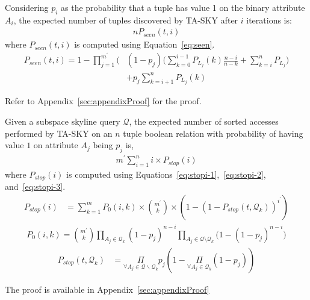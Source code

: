 \vspace{1mm}

\begin{lemma}\label{lemma:expectedDiscovery}
Considering $p_i$ as the probability that a tuple has value 1 on the binary attribute $A_i$, the expected number of tuples discovered by TA-SKY after $i$ iterations is:
\begin{align}\label{eq:expectedDiscovery}
n P_{seen}(t,i)
\end{align}
where $P_{seen}(t,i)$ is computed using Equation~\ref{eq:seen}.
\begin{align}\label{eq:seen}
\nonumber
P_{seen}(t,i) = 1 - \prod_{j=1}^{m^\prime} \Big( & (1 - p_j) \big(\sum_{k=0}^{i-1}P_{L_j}(k)\frac{n-i}{n-k} + \sum_{k=i}^{n}P_{L_j} \big) \\
                                                  & + p_j\sum_{k=i+1}^n P_{L_j}(k) %
\end{align}
\end{lemma}
Refer to Appendix~\ref{sec:appendixProof} for the proof.



\begin{theorem}\label{thm:expectedCostTA-SKY}
Given a subspace skyline query $\mathcal{Q}$, the expected number of sorted accesses performed by TA-SKY on an $n$ tuple boolean relation with probability of having value $1$ on attribute $A_j$ being $p_j$ is,
\begin{align}
m^\prime \sum_{i=1}^n i\times P_{stop}(i)
\end{align}
where $P_{stop}(i)$ is computed using Equations~\ref{eq:stopi-1},~\ref{eq:stopi-2}, and~\ref{eq:stopi-3}.
\begin{align}\label{eq:stopi-1}
P_{stop}(i) &= \sum_{k=1}^m P_0(i, k) \times {m^\prime \choose k} \times (1 - (1 - P_{stop}(t, \mathcal{Q}_k))^{i^\prime})
\end{align}
\begin{align}\label{eq:stopi-2}
P_0(i, k) = {m^\prime \choose k} \prod_{A_j \in \mathcal{Q}_k} (1 - p_j)^{n-i} \prod_{A_j \in \mathcal{Q} \setminus \mathcal{Q}_k} \big(1 - (1 - p_j)^{n-i}\big)
\end{align}
\begin{align}\label{eq:stopi-3}
P_{stop}(t, \mathcal{Q}_k) &= \underset{\forall A_j \in \mathcal{Q}\backslash \mathcal{Q}_k} {\Pi} p_j (1-\underset{\forall A_j \in \mathcal{Q}_k} {\Pi} (1 - p_j))
\end{align}
\end{theorem}
The proof is available in Appendix~\ref{sec:appendixProof}
